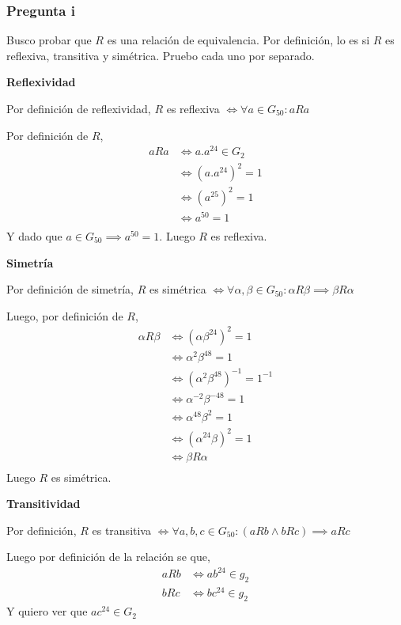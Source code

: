 \subsubsection{Pregunta i}
Busco probar que $R$ es una relación de equivalencia. Por definición, lo es si $R$ es reflexiva, transitiva y simétrica. Pruebo cada uno por separado.

\textbf{Reflexividad}

Por definición de reflexividad, $R$ es reflexiva $ \iff \forall a \in G_{50}: aRa $

Por definición de $R$,
\begin{align*}
    aRa &\iff a.a^{24} \in G_2 \\
    &\iff (a.a^{24})^2 = 1 \\
    &\iff (a^{25})^2 = 1 \\
    &\iff a^50 = 1 \\
\end{align*}
Y dado que $ a \in G_{50} \implies a^{50} = 1 $. Luego $R$ es reflexiva.

\textbf{Simetría}

Por definición de simetría, $R$ es simétrica $ \iff \forall \alpha, \beta \in G_{50}: \alpha R \beta \implies \beta R \alpha $

Luego, por definición de $R$,
\begin{align*}
    \alpha R \beta &\iff (\alpha \beta^{24})^2 = 1 \\
    &\iff \alpha^2 \beta^{48} = 1 \\
    &\iff (\alpha^2 \beta^{48})^{-1} = 1^{-1} \\
    &\iff \alpha^{-2} \beta^{-48} = 1 \\
    &\iff \alpha^{48} \beta^{2} = 1 \\
    &\iff (\alpha^{24} \beta)^2 = 1 \\
    &\iff \beta R \alpha \\
\end{align*}
Luego $R$ es simétrica.

\textbf{Transitividad}

Por definición, $R$ es transitiva $ \iff \forall a,b,c \in G_{50}: (aRb \wedge bRc) \implies aRc  $

Luego por definición de la relación se que,
\begin{align*}
    aRb &\iff ab^{24} \in g_2 \\
    bRc &\iff bc^{24} \in g_2
\end{align*}
Y quiero ver que $ ac^{24} \in G_2 $

